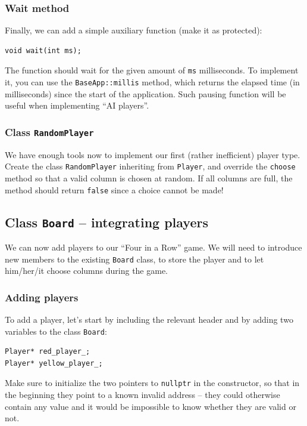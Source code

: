 \documentclass{article}
\begin{document}
\subsubsection{Wait method}

Finally, we can add a simple auxiliary function (make it as protected):
\begin{lstlisting}[style=mycpp,numbers=none]
void wait(int ms);
\end{lstlisting}
The function should wait for the given amount of \texttt{ms} milliseconds. To implement it, you can use the \texttt{BaseApp}\texttt{::}\texttt{millis} method, which returns the elapsed time (in milliseconds) since the start of the application. Such pausing function will be useful when implementing ``AI players''.



\subsubsection{Class \texttt{RandomPlayer}}

We have enough tools now to implement our first (rather inefficient) player type. Create the class \texttt{RandomPlayer} inheriting from \texttt{Player}, and override the \texttt{choose} method so that a valid column is chosen at random. If all columns are full, the method should return \texttt{false} since a choice cannot be made!






\subsection{Class \texttt{Board} -- integrating players}

We can now add players to our ``Four in a Row'' game. We will need to introduce new members to the existing \texttt{Board} class, to store the player and to let him/her/it choose columns during the game.



\subsubsection{Adding players}

To add a player, let's start by including the relevant header and by adding two variables to the class \texttt{Board}:
\begin{lstlisting}[style=mycpp,numbers=none]
Player* red_player_;
Player* yellow_player_;
\end{lstlisting}
Make sure to initialize the two pointers to \texttt{nullptr} in the constructor, so that in the beginning they point to a known invalid address -- they could otherwise contain any value and it would be impossible to know whether they are valid or not.
\end{document}
